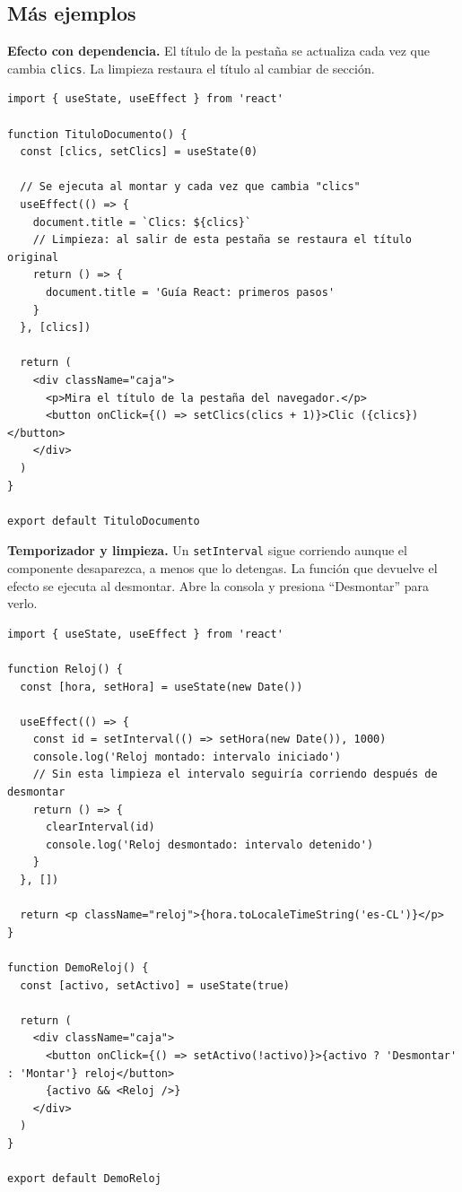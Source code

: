 \documentclass[11pt,a4paper]{article}
\newcommand{\cmd}[1]{\texttt{\color{reactdark}#1}}
\begin{document}
\subsection{Más ejemplos}

\textbf{Efecto con dependencia.} El título de la pestaña se actualiza cada vez que cambia \cmd{clics}. La limpieza restaura el título al cambiar de sección.

\begin{lstlisting}[language=JSX,title={\small\ttfamily src/components/efectos/TituloDocumento.jsx}]
import { useState, useEffect } from 'react'

function TituloDocumento() {
  const [clics, setClics] = useState(0)

  // Se ejecuta al montar y cada vez que cambia "clics"
  useEffect(() => {
    document.title = `Clics: ${clics}`
    // Limpieza: al salir de esta pestaña se restaura el título original
    return () => {
      document.title = 'Guía React: primeros pasos'
    }
  }, [clics])

  return (
    <div className="caja">
      <p>Mira el título de la pestaña del navegador.</p>
      <button onClick={() => setClics(clics + 1)}>Clic ({clics})</button>
    </div>
  )
}

export default TituloDocumento
\end{lstlisting}

\textbf{Temporizador y limpieza.} Un \cmd{setInterval} sigue corriendo aunque el componente desaparezca, a menos que lo detengas. La función que devuelve el efecto se ejecuta al desmontar. Abre la consola y presiona ``Desmontar'' para verlo.

\begin{lstlisting}[language=JSX,title={\small\ttfamily src/components/efectos/Reloj.jsx}]
import { useState, useEffect } from 'react'

function Reloj() {
  const [hora, setHora] = useState(new Date())

  useEffect(() => {
    const id = setInterval(() => setHora(new Date()), 1000)
    console.log('Reloj montado: intervalo iniciado')
    // Sin esta limpieza el intervalo seguiría corriendo después de desmontar
    return () => {
      clearInterval(id)
      console.log('Reloj desmontado: intervalo detenido')
    }
  }, [])

  return <p className="reloj">{hora.toLocaleTimeString('es-CL')}</p>
}

function DemoReloj() {
  const [activo, setActivo] = useState(true)

  return (
    <div className="caja">
      <button onClick={() => setActivo(!activo)}>{activo ? 'Desmontar' : 'Montar'} reloj</button>
      {activo && <Reloj />}
    </div>
  )
}

export default DemoReloj
\end{lstlisting}
\end{document}
